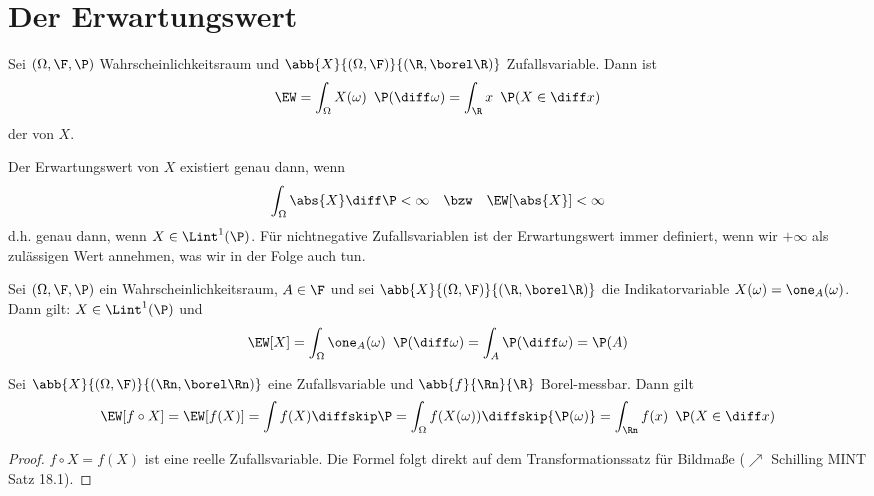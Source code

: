 \section{Der Erwartungswert}
\begin{definition}[Erwartungswert]
	\label{5_1_definition}
	Sei $(\Omega, \F, \P)$ Wahrscheinlichkeitsraum und $\abb{X}{(\Omega, \F)}{(\R, \borel\R)}$ Zufallsvariable. Dann ist
	\begin{equation*}
		\EW = \int_{\Omega} X(\omega) \enskip \P(\diff \omega) = \int_{\R} x \enskip \P(X  \in \diff x)
	\end{equation*}
	der  von $X$.
\end{definition}

\begin{*bemerkung}
	Der Erwartungswert von $X$ existiert genau dann, wenn
	\begin{equation*}
		\int_{\Omega} \abs{X} \diff \P < \infty \quad \bzw \quad \EW[\abs{X}] < \infty
	\end{equation*}
	d.h. genau dann, wenn $X \in \Lint^1(\P)$.
	Für nichtnegative Zufallsvariablen ist der Erwartungswert immer definiert, wenn wir $+\infty$ als zulässigen Wert annehmen, was wir in der Folge auch tun.
\end{*bemerkung}

\begin{beispiel}
	\label{5_2_beispiel}
	Sei $(\Omega, \F, \P)$ ein Wahrscheinlichkeitsraum, $A \in \F$ und sei $\abb{X}{(\Omega , \F)}{(\R , \borel\R)}$ die Indikatorvariable $X(\omega) = \one_{A} (\omega)$. Dann gilt: $X \in \Lint^1(\P)$ und
	\begin{equation*}
		\EW[X] = \int_{\Omega} \one_{A} (\omega) \enskip \P(\diff \omega) = \int_{A} \P(\diff \omega) = \P(A)
	\end{equation*}
\end{beispiel}

\begin{proposition}
	\label{5_3_proposition}
	Sei $\abb{X}{(\Omega, \F)}{ (\Rn, \borel\Rn)}$ eine Zufallsvariable und $\abb{f}{\Rn}{\R}$ Borel-messbar. Dann gilt
	\begin{equation*}
		\EW[f \circ X] = \EW[f(X)] = \int f(X) \diffskip\P = \int_{\Omega} f(X(\omega)) \diffskip{\P(\omega)} = \int_{\Rn} f(x) \enskip \P(X \in \diff x)
	\end{equation*}
\end{proposition}
\begin{proof}
	 $f \circ X = f(X)$ ist eine reelle Zufallsvariable. Die Formel folgt direkt auf dem Transformationssatz für Bildmaße ($\nearrow$ Schilling MINT Satz 18.1).
\end{proof}

